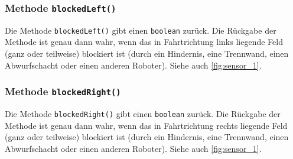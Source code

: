 \subsubsection{Methode \texttt{blockedLeft()}}

Die Methode \texttt{blockedLeft()} gibt einen \texttt{boolean} zurück. 
Die Rückgabe der Methode ist genau dann wahr, wenn das in Fahrtrichtung links liegende Feld (ganz oder teilweise) blockiert ist (durch ein Hindernis, eine Trennwand, einen Abwurfschacht oder einen anderen Roboter). 
Siehe auch \autoref{fig:sensor_1}.


\subsubsection{Methode \texttt{blockedRight()}}

Die Methode \texttt{blockedRight()} gibt einen \texttt{boolean} zurück. 
Die Rückgabe der Methode ist genau dann wahr, wenn das in Fahrtrichtung rechts liegende Feld (ganz oder teilweise) blockiert ist (durch ein Hindernis, eine Trennwand, einen Abwurfschacht oder einen anderen Roboter). 
Siehe auch \autoref{fig:sensor_1}.






